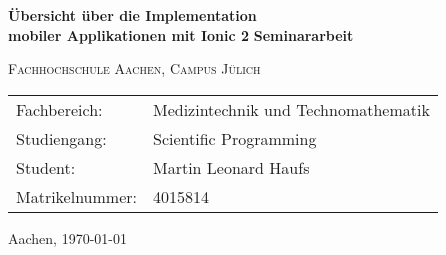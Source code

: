 \begin{titlepage}
	\begin{flushright}
		\textbf{\Large Übersicht über die Implementation \\mobiler Applikationen mit Ionic 2}\linebreak
		\linebreak
		\textbf{\Large Seminararbeit}\linebreak
		\linebreak
	\end{flushright}
	\vfill
	\raggedright\textsc{Fachhochschule Aachen, Campus Jülich}\linebreak%
	\begin{tabular*}{\linewidth}{ll}
		Fachbereich: & Medizintechnik und Technomathematik\\
		Studiengang: & Scientific Programming\\
		Student: & Martin Leonard Haufs\\ 
		Matrikelnummer: & 4015814
	\end{tabular*}
	\vfill	
	\centering\large Aachen, \today
\end{titlepage}